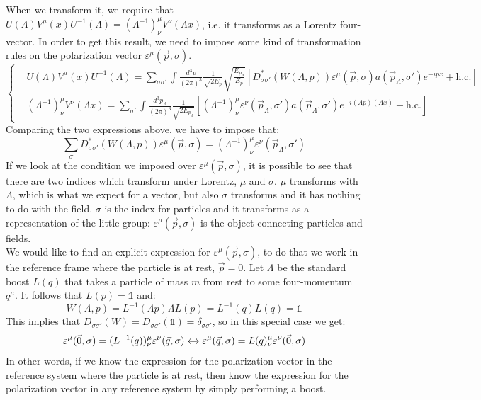 \documentclass[../main.tex]{subfiles}
\begin{document}
When we transform it, we require that $U(\Lambda)V^\mu(x)U^{-1}(\Lambda)=(\Lambda^{-1})^\mu_\nu V^\nu(\Lambda x)$, i.e. it transforms as a Lorentz four-vector. In order to get this result, we need to impose some kind of transformation rules on the polarization vector $\varepsilon^\mu(\vec{p},\sigma)$.
\[
\left\{
\begin{aligned}
&U(\Lambda)V^\mu(x)U^{-1}(\Lambda)=\sum_{\sigma\sigma'}\int\frac{d^3p}{(2\pi)^3}\frac{1}{\sqrt{2E_p}}\sqrt{\frac{E_{p_\Lambda}}{E_p}}\left[D_{\sigma\sigma'}^*(W(\Lambda,p))\varepsilon^\mu(\vec{p},\sigma)a(\vec{p}_\Lambda,\sigma')e^{-ipx}+\text{h.c.}\right]\\
&(\Lambda^{-1})^\mu_\nu V^\nu(\Lambda x)=\sum_{\sigma'}\int\frac{d^3p_\Lambda}{(2\pi)^3}\frac{1}{\sqrt{2E_{p_\Lambda}}}[(\Lambda^{-1})^\mu_\nu\varepsilon^\nu(\Vec{p}_\Lambda,\sigma')a(\Vec{p}_\Lambda,\sigma')e^{-i(\Lambda p)(\Lambda x)}+\text{h.c.}]
\end{aligned}
\right.
\]
Comparing the two expressions above, we have to impose that:
\[
\sum_\sigma D_{\sigma\sigma'}^*(W(\Lambda,p))\varepsilon^\mu(\vec{p},\sigma)=(\Lambda^{-1})^\mu_\nu\varepsilon^\nu(\vec{p}_\Lambda,\sigma')
\]
If we look at the condition we imposed over $\varepsilon^\mu(\vec{p},\sigma)$, it is possible to see that there are two indices which transform under Lorentz, $\mu$ and $\sigma$. $\mu$ transforms with $\Lambda$, which is what we expect for a vector, but also $\sigma$ transforms and it has nothing to do with the field. $\sigma$ is the index for particles and it transforms as a representation of the little group: $\varepsilon^\mu(\vec{p},\sigma)$ is the object connecting particles and fields.\\
We would like to find an explicit expression for $\varepsilon^\mu(\vec{p},\sigma)$, to do that we work in the reference frame where the particle is at rest, $\Vec{p}=0$. Let $\Lambda$ be the standard boost $L(q)$ that takes a particle of mass $m$ from rest to some four-momentum $q^\mu$. It follows that $L(p)=\mathbb{1}$ and:
\[
W(\Lambda,p)=L^{-1}(\Lambda p)\Lambda L(p)=L^{-1}(q)L(q)=\mathbb{1}
\]
This implies that $D_{\sigma\sigma'}(W)=D_{\sigma\sigma'}(\mathbb{1})=\delta_{\sigma\sigma'}$, so in this special case we get:
\[
\varepsilon^\mu(\Vec{0},\sigma)=(L^{-1}(q))^\mu_\nu\varepsilon^\nu(\vec{q},\sigma)\xleftrightarrow[]{}\varepsilon^\mu(\vec{q},\sigma)=L(q)^\mu_\nu\varepsilon^\nu(\Vec{0},\sigma)
\]
In other words, if we know the expression for the polarization vector in the reference system where the particle is at rest, then know the expression for the polarization vector in any reference system by simply performing a boost.\\
\end{document}
